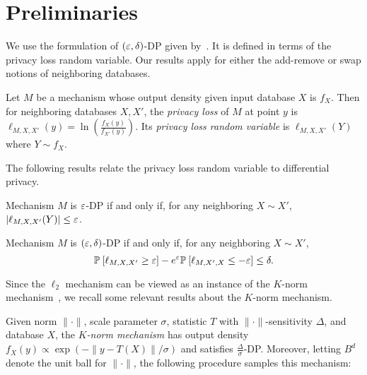 \section{Preliminaries}
\label{sec:prelims}

We use the formulation of $(\varepsilon, \delta)$-DP given by~\citet{BW18}. It is defined in terms of the privacy loss random variable. Our results apply for either the add-remove or swap notions of neighboring databases.

\begin{definition}
\label{def:plrv}
    Let $M$ be a mechanism whose output density given input database $X$ is $f_X$. Then for neighboring databases $X, X'$, the \emph{privacy loss} of $M$ at point $y$ is $\ell_{M,X,X'}(y) = \ln\left(\tfrac{f_X(y)}{f_{X'}(y)}\right)$. Its \emph{privacy loss random variable} is $\ell_{M,X,X'}(Y)$ where $Y \sim f_X$.
\end{definition}
The following results relate the privacy loss random variable to differential privacy.
\begin{lemma}
\label{lem:plrv_pure_dp}
    Mechanism $M$ is $\varepsilon$-DP if and only if, for any neighboring $X \sim X'$, $|\ell_{M,X,X'}(Y)| \leq \varepsilon$.
\end{lemma}

\begin{lemma}[\citet{BW18}]
\label{lem:approx_dp}
    Mechanism $M$ is $(\varepsilon, \delta)$-DP if and only if, for any neighboring $X \sim X'$,
    \begin{equation*}
        \mathbb{P}_{}\left[\ell_{M,X,X'} \geq \varepsilon\right] - e^\varepsilon\mathbb{P}_{}\left[\ell_{M,X',X}  \leq -\varepsilon\right] \leq \delta.
    \end{equation*}
\end{lemma}

Since the $\ell_2$ mechanism can be viewed as an instance of the $K$-norm mechanism~\cite{HT10}, we recall some relevant results about the $K$-norm mechanism.

\begin{lemma}[\citet{HT10}]
\label{lem:k_norm}
    Given norm $\|\cdot\|$, scale parameter $\sigma$, statistic $T$ with $\|\cdot\|$-sensitivity $\Delta$, and database $X$, the \emph{$K$-norm mechanism} has output density $f_X(y) \propto \exp\left(-\|y - T(X)\| / \sigma\right)$ and satisfies $\frac{\Delta}{\sigma}$-DP. Moreover, letting $B^d$ denote the unit ball for $\|\cdot\|$, the following procedure samples this mechanism: 
\end{lemma}